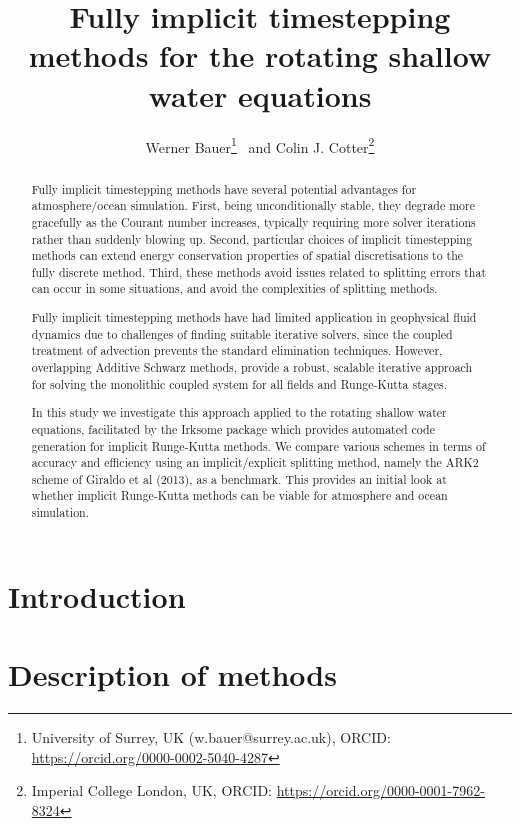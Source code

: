 \documentclass[a4paper, 12pt]{article}
\title{Fully implicit timestepping methods for the rotating shallow water equations}
\author{Werner Bauer\footnote{University of Surrey, UK (w.bauer@surrey.ac.uk), ORCID: \url{https://orcid.org/0000-0002-5040-4287}} \ and
Colin J. Cotter\footnote{Imperial College London, UK, ORCID: \url{https://orcid.org/0000-0001-7962-8324}}}
\begin{document}
\maketitle

\begin{abstract}
Fully implicit timestepping methods have several potential advantages for atmosphere/ocean simulation. First, being unconditionally stable, they degrade more gracefully as the Courant number increases, typically requiring more solver iterations rather than suddenly blowing up. Second, particular choices of implicit timestepping methods can extend energy conservation properties of spatial discretisations to the fully discrete method. Third, these methods avoid issues related to splitting errors that can occur in some situations, and avoid the complexities of splitting methods.

Fully implicit timestepping methods have had limited application in
geophysical fluid dynamics due to challenges of finding suitable
iterative solvers, since the coupled treatment of advection prevents
the standard elimination techniques. However, overlapping Additive
Schwarz methods, provide a robust, scalable iterative approach for
solving the monolithic coupled system for all fields and Runge-Kutta
stages.

In this study we investigate this approach applied to the rotating
shallow water equations, facilitated by the Irksome package which
provides automated code generation for implicit Runge-Kutta
methods. We compare various schemes in terms of accuracy and
efficiency using an implicit/explicit splitting method, namely the
ARK2 scheme of Giraldo et al (2013), as a benchmark. This provides an
initial look at whether implicit Runge-Kutta methods can be viable for
atmosphere and ocean simulation.
\end{abstract}

\section{Introduction}


\section{Description of methods}
\end{document}

